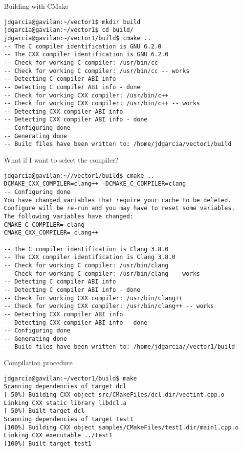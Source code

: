 \begin{frame}[t,fragile]{Building with CMake}
\begin{lstlisting}[style=terminal,basicstyle=\tiny\ttfamily]
jdgarcia@gavilan:~/vector1$ mkdir build
jdgarcia@gavilan:~/vector1$ cd build/
jdgarcia@gavilan:~/vector1/build$ cmake ..
-- The C compiler identification is GNU 6.2.0
-- The CXX compiler identification is GNU 6.2.0
-- Check for working C compiler: /usr/bin/cc
-- Check for working C compiler: /usr/bin/cc -- works
-- Detecting C compiler ABI info
-- Detecting C compiler ABI info - done
-- Check for working CXX compiler: /usr/bin/c++
-- Check for working CXX compiler: /usr/bin/c++ -- works
-- Detecting CXX compiler ABI info
-- Detecting CXX compiler ABI info - done
-- Configuring done
-- Generating done
-- Build files have been written to: /home/jdgarcia/vector1/build
\end{lstlisting}
\end{frame}

\begin{frame}[t,fragile]{What if I want to select the compiler?}
\begin{lstlisting}[style=terminal,basicstyle=\tiny\ttfamily]
jdgarcia@gavilan:~//vector1/build$ cmake .. -DCMAKE_CXX_COMPILER=clang++ -DCMAKE_C_COMPILER=clang
-- Configuring done
You have changed variables that require your cache to be deleted.
Configure will be re-run and you may have to reset some variables.
The following variables have changed:
CMAKE_C_COMPILER= clang
CMAKE_CXX_COMPILER= clang++

-- The C compiler identification is Clang 3.8.0
-- The CXX compiler identification is Clang 3.8.0
-- Check for working C compiler: /usr/bin/clang
-- Check for working C compiler: /usr/bin/clang -- works
-- Detecting C compiler ABI info
-- Detecting C compiler ABI info - done
-- Check for working CXX compiler: /usr/bin/clang++
-- Check for working CXX compiler: /usr/bin/clang++ -- works
-- Detecting CXX compiler ABI info
-- Detecting CXX compiler ABI info - done
-- Configuring done
-- Generating done
-- Build files have been written to: /home/jdgarcia//vector1/build
\end{lstlisting}
\end{frame}

\begin{frame}[t,fragile]{Compilation procedure}
\begin{lstlisting}[style=terminal,basicstyle=\tiny\ttfamily]
jdgarcia@gavilan:~/vector1/build$ make
Scanning dependencies of target dcl
[ 50%] Building CXX object src/CMakeFiles/dcl.dir/vectint.cpp.o
Linking CXX static library libdcl.a
[ 50%] Built target dcl
Scanning dependencies of target test1
[100%] Building CXX object samples/CMakeFiles/test1.dir/main1.cpp.o
Linking CXX executable ../test1
[100%] Built target test1
\end{lstlisting}
\end{frame}
